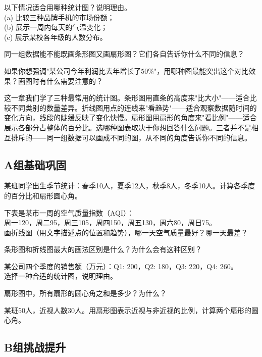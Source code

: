 \begin{exercise}
\item 以下情况适合用哪种统计图？说明理由。\\
(a) 比较三种品牌手机的市场份额；\\
(b) 展示一周内每天的气温变化；\\
(c) 展示某校各年级的人数分布。
\item 同一组数据能不能既画条形图又画扇形图？它们各自告诉你什么不同的信息？
\item 如果你想强调"某公司今年利润比去年增长了$50\%$"，用哪种图最能突出这个对比效果？画图时有什么需要注意的？
\end{exercise}


这一章我们学了三种最常用的统计图。条形图用直条的高度来"比大小"——适合比较不同类别的数量差异。折线图用点的连线来"看趋势"——适合观察数据随时间的变化方向，线段的陡缓反映了变化快慢。扇形图用扇形的角度来"看比例"——适合展示各部分占整体的百分比。选哪种图表取决于你想回答什么问题。三者并不是相互排斥的——同一组数据可以画成不同的图，从不同的角度告诉你不同的信息。


\subsection*{A组\quad 基础巩固}

\begin{exercise}
\item 某班同学出生季节统计：春季10人，夏季12人，秋季8人，冬季10人。计算各季度的百分比和扇形圆心角。
\item 下表是某市一周的空气质量指数（AQI）：\\
周一120，周二95，周三105，周四150，周五130，周六80，周日75。\\
画折线图（用文字描述点的位置和趋势），哪一天空气质量最好？哪一天最差？
\item 条形图和折线图最大的画法区别是什么？为什么会有这种区别？
\item 某公司四个季度的销售额（万元）：Q1: 200，Q2: 180，Q3: 220，Q4: 260。\\
选择一种合适的统计图，说明理由。
\item 扇形图中，所有扇形的圆心角之和是多少？为什么？
\item 某班$50$人，近视人数$30$人。用扇形图表示近视与非近视的比例，计算两个扇形的圆心角。
\end{exercise}

\subsection*{B组\quad 挑战提升}

